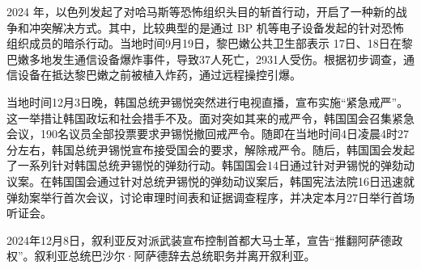 2024 年，以色列发起了对哈马斯等恐怖组织头目的斩首行动，开启了一种新的战争和冲突解决方式。其中，比较典型的是通过 BP 机等电子设备发起的针对恐怖组织成员的暗杀行动。当地时间9月19日，黎巴嫩公共卫生部表示 17日、18日在黎巴嫩多地发生通信设备爆炸事件，导致37人死亡，2931人受伤。根据初步调查，通信设备在抵达黎巴嫩之前被植入炸药，通过远程操控引爆。

当地时间12月3日晚，韩国总统尹锡悦突然进行电视直播，宣布实施“紧急戒严”。这一举措让韩国政坛和社会措手不及。面对突如其来的戒严令，韩国国会召集紧急会议，190名议员全部投票要求尹锡悦撤回戒严令。随即在当地时间4日凌晨4时27分左右，韩国总统尹锡悦宣布接受国会的要求，解除戒严令。随后，韩国国会发起了一系列针对韩国总统尹锡悦的弹劾行动。韩国国会14日通过针对尹锡悦的弹劾动议案。在韩国国会通过针对总统尹锡悦的弹劾动议案后，韩国宪法法院16日迅速就弹劾案举行首次会议，讨论审理时间表和证据调查程序，并决定本月27日举行首场听证会。

2024年12月8日，叙利亚反对派武装宣布控制首都大马士革，宣告“推翻阿萨德政权”。叙利亚总统巴沙尔·阿萨德辞去总统职务并离开叙利亚。